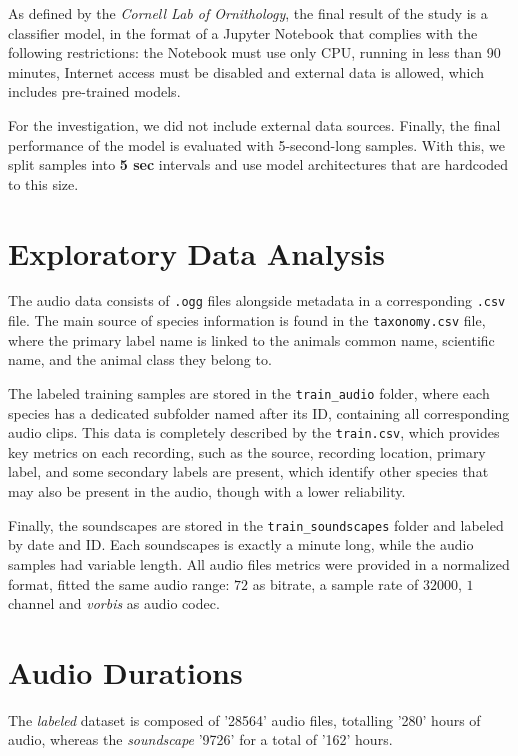 \documentclass[10pt]{article}
\begin{document}
As defined by the \textit{Cornell Lab of Ornithology}, the final result of the study is a classifier model, in the format of a Jupyter Notebook that complies with the following restrictions: the Notebook must use only CPU, running in less than 90 minutes, Internet access must be disabled and external data is allowed, which includes pre-trained models.

For the investigation, we did not include external data sources. Finally, the final performance of the model is evaluated with 5-second-long samples. With this, we split samples into \textbf{5 sec} intervals and use model architectures that are hardcoded to this size.

\section*{Exploratory Data Analysis}

The audio data consists of \texttt{.ogg} files alongside metadata in a corresponding \texttt{.csv} file. The main source of species information is found in the \texttt{taxonomy.csv} file, where the primary label name is linked to the animals common name, scientific name, and the animal class they belong to.

The labeled training samples are stored in the \texttt{train\_audio} folder, where each species has a dedicated subfolder named after its ID, containing all corresponding audio clips. This data is completely described by the \texttt{train.csv}, which provides key metrics on each recording, such as the source, recording location, primary label, and some secondary labels are present, which identify other species that may also be present in the audio, though with a lower reliability.

Finally, the soundscapes are stored in the \texttt{train\_soundscapes} folder and labeled by date and ID. Each soundscapes is exactly a minute long, while the audio samples had variable length. All audio files metrics were provided in a normalized format, fitted the same audio range: $72$ as bitrate, a sample rate of $32000$, $1$ channel and \textit{vorbis} as audio codec.

\section*{Audio Durations}

The \textit{labeled} dataset is composed of '28564' audio files, totalling '280' hours of audio, whereas the \textit{soundscape} '9726' for a total of '162' hours.
\end{document}
